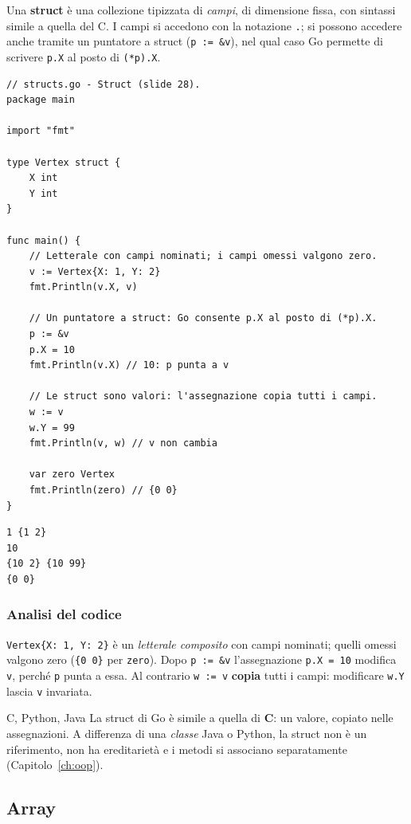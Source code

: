 \documentclass[11pt,a4paper]{report}
\newcommand{\cod}[1]{\texttt{#1}}
\begin{document}
Una \textbf{struct} è una collezione tipizzata di \emph{campi}, di dimensione
fissa, con sintassi simile a quella del C. I campi si accedono con la notazione
\cod{.}; si possono accedere anche tramite un puntatore a struct
(\cod{p := \&v}), nel qual caso Go permette di scrivere \cod{p.X} al posto di
\cod{(*p).X}.

\begin{lstlisting}[style=gocode,caption={\texttt{04\_data\_structures/structs.go}}]
// structs.go - Struct (slide 28).
package main

import "fmt"

type Vertex struct {
	X int
	Y int
}

func main() {
	// Letterale con campi nominati; i campi omessi valgono zero.
	v := Vertex{X: 1, Y: 2}
	fmt.Println(v.X, v)

	// Un puntatore a struct: Go consente p.X al posto di (*p).X.
	p := &v
	p.X = 10
	fmt.Println(v.X) // 10: p punta a v

	// Le struct sono valori: l'assegnazione copia tutti i campi.
	w := v
	w.Y = 99
	fmt.Println(v, w) // v non cambia

	var zero Vertex
	fmt.Println(zero) // {0 0}
}
\end{lstlisting}
\begin{lstlisting}[style=output]
1 {1 2}
10
{10 2} {10 99}
{0 0}
\end{lstlisting}

\subsubsection*{Analisi del codice}

\cod{Vertex\{X: 1, Y: 2\}} è un \emph{letterale composito} con campi nominati;
quelli omessi valgono zero (\cod{\{0 0\}} per \cod{zero}). Dopo \cod{p := \&v}
l'assegnazione \cod{p.X = 10} modifica \cod{v}, perché \cod{p} punta a essa. Al
contrario \cod{w := v} \textbf{copia} tutti i campi: modificare \cod{w.Y} lascia
\cod{v} invariata.

\begin{confronto}{C, Python, Java}
La struct di Go è simile a quella di \textbf{C}: un valore, copiato
nelle assegnazioni. A differenza di una \emph{classe} Java o Python, la struct
non è un riferimento, non ha ereditarietà e i metodi si associano
separatamente (Capitolo~\ref{ch:oop}).
\end{confronto}

\subsection{Array}
\end{document}
